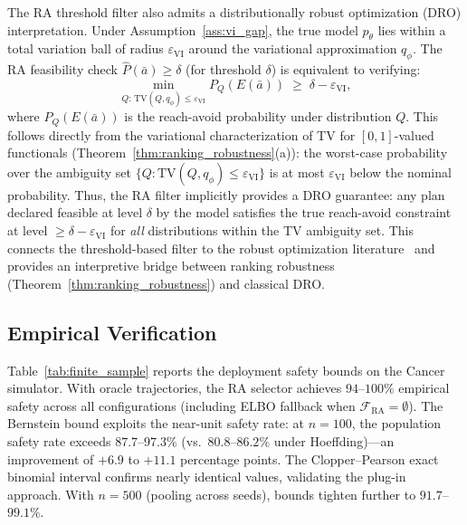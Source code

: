 \documentclass{article}
\newcommand{\TV}{\mathrm{TV}}
\newcommand{\ba}{\bar{a}}
\newcommand{\cF}{\mathcal{F}}
\begin{document}
The RA threshold filter also admits a distributionally robust optimization (DRO) interpretation. Under Assumption~\ref{ass:vi_gap}, the true model $p_\theta$ lies within a total variation ball of radius $\varepsilon_{\mathrm{VI}}$ around the variational approximation $q_\phi$. The RA feasibility check $\hat{P}(\ba) \geq \delta$ (for threshold $\delta$) is equivalent to verifying:
\[
\min_{Q:\, \TV(Q, q_\phi) \leq \varepsilon_{\mathrm{VI}}} P_Q(E(\ba)) \;\geq\; \delta - \varepsilon_{\mathrm{VI}},
\]
where $P_Q(E(\ba))$ is the reach-avoid probability under distribution $Q$. This follows directly from the variational characterization of TV for $[0,1]$-valued functionals (Theorem~\ref{thm:ranking_robustness}(a)): the worst-case probability over the ambiguity set $\{Q : \TV(Q, q_\phi) \leq \varepsilon_{\mathrm{VI}}\}$ is at most $\varepsilon_{\mathrm{VI}}$ below the nominal probability. Thus, the RA filter implicitly provides a DRO guarantee: any plan declared feasible at level $\delta$ by the model satisfies the true reach-avoid constraint at level $\geq \delta - \varepsilon_{\mathrm{VI}}$ for \emph{all} distributions within the TV ambiguity set. This connects the threshold-based filter to the robust optimization literature~\citep{iyengar2005robust} and provides an interpretive bridge between ranking robustness (Theorem~\ref{thm:ranking_robustness}) and classical DRO.

\subsection{Empirical Verification}

Table~\ref{tab:finite_sample} reports the deployment safety bounds on the Cancer simulator. With oracle trajectories, the RA selector achieves $94$--$100\%$ empirical safety across all configurations (including ELBO fallback when $\cF_{\mathrm{RA}} = \emptyset$). The Bernstein bound exploits the near-unit safety rate: at $n = 100$, the population safety rate exceeds $87.7$--$97.3\%$ (vs.\ $80.8$--$86.2\%$ under Hoeffding)---an improvement of $+6.9$ to $+11.1$ percentage points. The Clopper--Pearson exact binomial interval confirms nearly identical values, validating the plug-in approach. With $n = 500$ (pooling across seeds), bounds tighten further to $91.7$--$99.1\%$.
\end{document}
